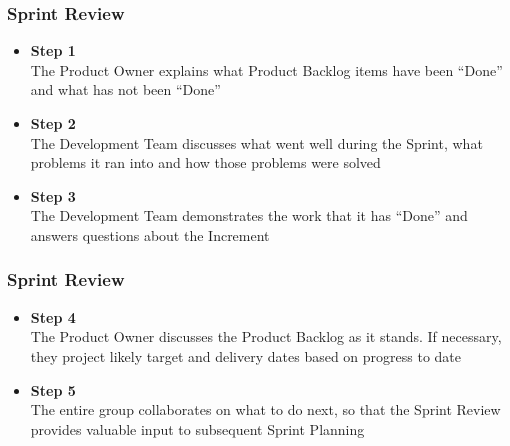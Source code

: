 \begin{frame}
    \frametitle{Sprint Review}
    \begin{itemize}
        \setlength\itemsep{0.7em}
        \item<1-> \textbf{Step 1}\\
        The Product Owner explains what Product Backlog items have been ``Done'' and what has not been ``Done''
        \item<2-> \textbf{Step 2}\\
        The Development Team discusses what went well during the Sprint, what problems it ran into and how those problems were solved
        \item<3-> \textbf{Step 3}\\
        The Development Team demonstrates the work that it has ``Done'' and answers questions about the Increment
    \end{itemize}
\end{frame}

\begin{frame}
    \frametitle{Sprint Review}
    \begin{itemize}
        \setlength\itemsep{0.7em}
        \item<1-> \textbf{Step 4}\\
        The Product Owner discusses the Product Backlog as it stands. If necessary, they project likely target and delivery dates based on progress to date
        \item<2-> \textbf{Step 5}\\
        The entire group collaborates on what to do next, so that the Sprint Review provides valuable input to subsequent Sprint Planning
    \end{itemize}
\end{frame}